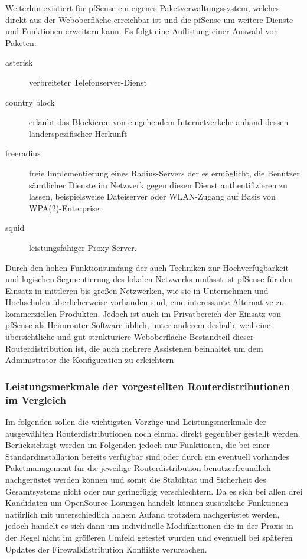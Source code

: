 \documentclass[a4paper,12pt]{scrartcl}
\begin{document}
Weiterhin existiert f\"ur pfSense ein eigenes Paketverwaltungssystem, welches
direkt aus der Weboberfl\"ache erreichbar ist und die pfSense um weitere
Dienste und Funktionen erweitern kann. Es folgt eine Auflistung einer Auswahl
von Paketen:
\begin{description}
 \item[asterisk] verbreiteter Telefonserver-Dienst
 \item[country block] erlaubt das Blockieren von eingehendem Internetverkehr
anhand dessen l\"anderspezifischer Herkunft
 \item[freeradius] freie Implementierung eines Radius-Servers der es
erm\"oglicht, die Benutzer s\"amtlicher Dienste im Netzwerk gegen diesen Dienst
authentifizieren zu lassen, beispielsweise Dateiserver oder WLAN-Zugang auf
Basis von WPA(2)-Enterprise.
 \item[squid] leistungsf\"ahiger Proxy-Server.
\end{description}

Durch den hohen Funktionsumfang der auch Techniken zur Hochverf\"ugbarkeit und
logischen Segmentierung des lokalen Netzwerks umfasst ist pfSense f\"ur den
Einsatz in mittleren bis gro\ss{}en Netzwerken, wie sie in Unternehmen und
Hochschulen \"uberlicherweise vorhanden sind, eine interessante Alternative zu
kommerziellen Produkten. Jedoch ist auch im Privatbereich der Einsatz von
pfSense als Heimrouter-Software \"ublich, unter anderem deshalb, weil eine
\"ubersichtliche und gut strukturiere Weboberfl\"ache Bestandteil dieser
Routerdistribution ist, die auch mehrere Assistenen beinhaltet um dem
Administrator die Konfiguration zu erleichtern

\subsubsection{Leistungsmerkmale der vorgestellten Routerdistributionen im
Vergleich}
Im folgenden sollen die wichtigsten Vorz\"uge und Leistungsmerkmale der
ausgew\"ahlten Routerdistributionen noch einmal direkt gegen\"uber gestellt
werden.\\


Ber\"ucksichtigt werden im Folgenden jedoch nur Funktionen, die bei einer
Standardinstallation bereits verf\"ugbar sind oder durch ein eventuell
vorhandes Paketmanagement f\"ur die jeweilige Routerdistribution
benutzerfreundlich nachger\"ustet werden k\"onnen und somit die Stabilit\"at
und Sicherheit des Gesamtsystems nicht oder nur geringf\"ugig verschlechtern.
Da es sich bei allen drei Kandidaten um OpenSource-L\"osungen handelt k\"onnen
zus\"atzliche Funktionen nat\"urlich mit unterschiedlich hohem Aufand trotzdem
nachger\"ustet werden, jedoch handelt es sich dann um individuelle
Modifikationen die in der Praxis in der Regel nicht im gr\"o\ss{}eren Umfeld
getestet wurden und eventuell bei sp\"ateren Updates der Firewalldistribution
Konflikte verursachen.\\
\end{document}
